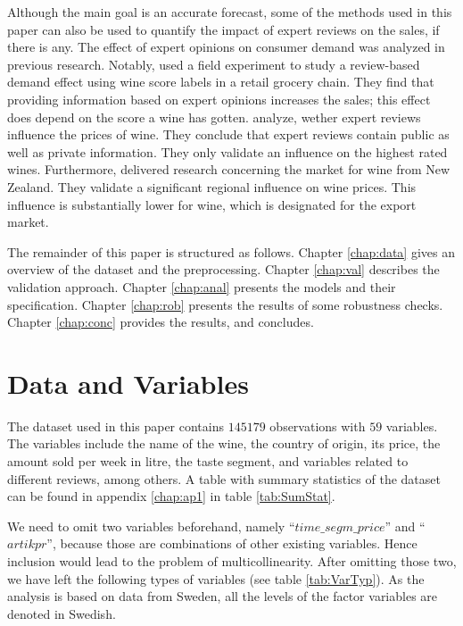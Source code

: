 \documentclass[11pt,]{article}
\begin{document}
Although the main goal is an accurate forecast, some of the methods used
in this paper can also be used to quantify the impact of expert reviews
on the sales, if there is any. The effect of expert opinions on consumer
demand was analyzed in previous research. Notably,
\textcite[][p. 1289]{Hilger2011} used a field experiment to study a
review-based demand effect using wine score labels in a retail grocery
chain. They find that providing information based on expert opinions
increases the sales; this effect does depend on the score a wine has
gotten. \textcite[][p. 293]{Ashenfelter2013} analyze, wether expert
reviews influence the prices of wine. They conclude that expert reviews
contain public as well as private information. They only validate an
influence on the highest rated wines. Furthermore,
\textcite[][p. 182f.]{Bicknell2012} delivered research concerning the
market for wine from New Zealand. They validate a significant regional
influence on wine prices. This influence is substantially lower for
wine, which is designated for the export market.

The remainder of this paper is structured as follows. Chapter
\ref{chap:data} gives an overview of the dataset and the preprocessing.
Chapter \ref{chap:val} describes the validation approach. Chapter
\ref{chap:anal} presents the models and their specification. Chapter
\ref{chap:rob} presents the results of some robustness checks. Chapter
\ref{chap:conc} provides the results, and concludes.

\hypertarget{data-and-variables}{%
\section{\texorpdfstring{Data and Variables
\label{chap:data}}{Data and Variables }}\label{data-and-variables}}

The dataset used in this paper contains \(145179\) observations with
\(59\) variables. The variables include the name of the wine, the
country of origin, its price, the amount sold per week in litre, the
taste segment, and variables related to different reviews, among others.
A table with summary statistics of the dataset can be found in appendix
\ref{chap:ap1} in table \ref{tab:SumStat}.

We need to omit two variables beforehand, namely
\enquote{\(time\_segm\_price\)} and \enquote{\(artikpr\)}, because those
are combinations of other existing variables. Hence inclusion would lead
to the problem of multicollinearity. After omitting those two, we have
left the following types of variables (see table \ref{tab:VarTyp}). As
the analysis is based on data from Sweden, all the levels of the factor
variables are denoted in Swedish.
\end{document}
